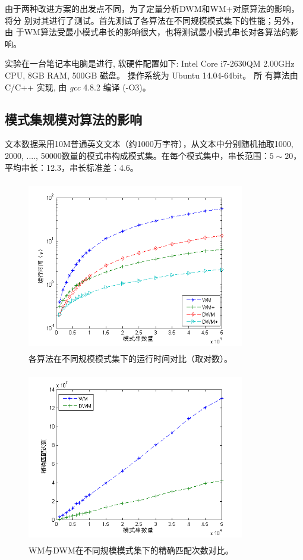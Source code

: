 由于两种改进方案的出发点不同，为了定量分析DWM和WM+对原算法的影响，将分
别对其进行了测试。首先测试了各算法在不同规模模式集下的性能；另外，由
于WM算法受最小模式串长的影响很大，也将测试最小模式串长对各算法的影响。

实验在一台笔记本电脑是进行, 软硬件配置如下: Intel Core i7-2630QM
2.00GHz CPU, 8GB RAM, 500GB 磁盘。 操作系统为 Ubuntu 14.04-64bit。  所
有算法由 C/C++ 实现, 由 \emph{gcc} 4.8.2 编译 (-O3)。

\subsection{模式集规模对算法的影响}
\label{sec:5_exp_1}

文本数据采用10M普通英文文本（约1000万字符），从文本中分别随机抽取1000,
2000, ...., 50000数量的模式串构成模式集。在每个模式集中，串长范围：$5
\sim 20$，平均串长：12.3，串长标准差：4.6。


\begin{figure}[H]
  \centering
  \includegraphics[height=7.5cm ,width=9.5cm]{figures/5_WM/WM_exp1.png}
  \caption{各算法在不同规模模式集下的运行时间对比（取对数）。}
  \label{fig:WM_exp1}
\end{figure}

\begin{figure}[H]
  \centering
  \includegraphics[height=7.5cm ,width=9.5cm]{figures/5_WM/WM_exp2.png}
  \caption{WM与DWM在不同规模模式集下的精确匹配次数对比。}
  \label{fig:WM_exp2}
\end{figure}



